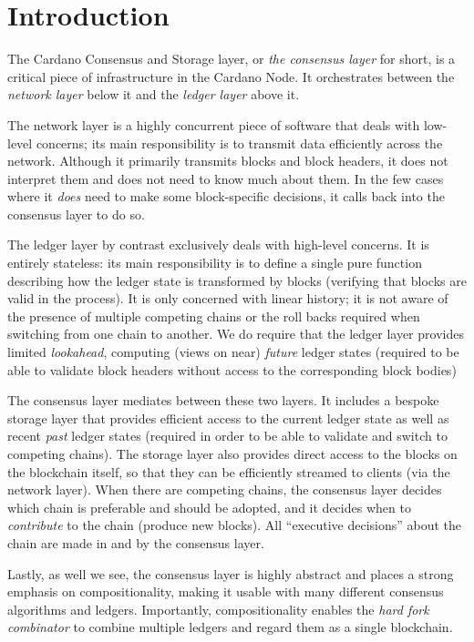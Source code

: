 \chapter{Introduction}

The Cardano Consensus and Storage layer, or \emph{the consensus layer} for
short, is a critical piece of infrastructure in the Cardano Node. It
orchestrates between the \emph{network layer} below it and the
\emph{ledger layer} above it.

The network layer is a highly concurrent piece of software that deals with
low-level concerns; its main responsibility is to transmit data efficiently
across the network. Although it primarily transmits blocks and block headers, it
does not interpret them and does not need to know much about them. In the few
cases where it \emph{does} need to make some block-specific decisions, it
calls back into the consensus layer to do so.

The ledger layer by contrast exclusively deals with high-level concerns. It is
entirely stateless: its main responsibility is to define a single pure
function describing how the ledger state is transformed by blocks (verifying
that blocks are valid in the process). It is only concerned with linear history;
it is not aware of the presence of multiple competing chains or the roll backs
required when switching from one chain to another. We do require that the ledger
layer provides limited \emph{lookahead}, computing (views on near)
\emph{future} ledger states (required to be able to validate block headers
without access to the corresponding block bodies)

The consensus layer mediates between these two layers. It includes a
bespoke storage layer that provides efficient access to the current ledger state
as well as recent \emph{past} ledger states (required in order to be able
to validate and switch to competing chains). The storage layer also
provides direct access to the blocks on the blockchain itself, so that they can
be efficiently streamed to clients (via the network layer). When there are
competing chains, the consensus layer decides which chain is preferable and
should be adopted, and it decides when to \emph{contribute} to the chain
(produce new blocks). All ``executive decisions'' about the chain are made in
and by the consensus layer.

Lastly, as well we see, the consensus layer is highly abstract and places a
strong emphasis on compositionality, making it usable with many different
consensus algorithms and ledgers. Importantly, compositionality enables the
\emph{hard fork combinator} to combine multiple ledgers and regard them as a
single blockchain.

